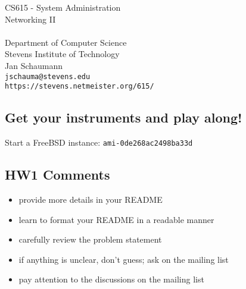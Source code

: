 \documentclass[xga]{xdvislides}
\begin{document}
\setfontphv

\lhead{\slidetitle}                               %
\cfoot{\relax}                               %
\rfoot{\Gray{\today}}

\vspace*{\fill}
\begin{center}
	\Hugesize
		CS615 - System Administration\\ [1em]
		Networking II\\ [1em]
	\hspace*{5mm}\blueline\\ [1em]
	\Normalsize
		Department of Computer Science\\
		Stevens Institute of Technology\\
		Jan Schaumann\\
		\verb+jschauma@stevens.edu+\\
		\verb+https://stevens.netmeister.org/615/+
\end{center}
\vspace*{\fill}

\subsection{Get your instruments and play along!}

\Hugesize
\vspace*{\fill}
Start a FreeBSD instance: {\tt ami-0de268ac2498ba33d}
\vspace*{\fill}
\Normalsize

\subsection{HW1 Comments}

\begin{itemize}
	\item provide more details in your README
	\item learn to format your README in a
		readable manner
	\item carefully review the problem statement
	\item if anything is unclear, don't guess; ask on the mailing list
	\item pay attention to the discussions on the mailing list
\end{itemize}
\end{document}
